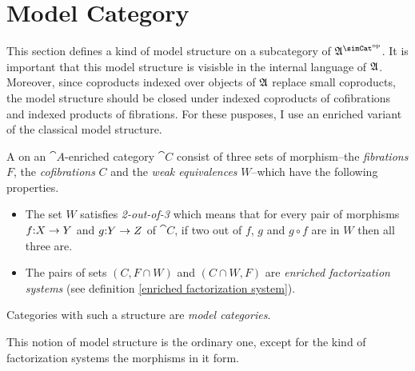\documentclass[csh.tex]{subfiles}
\begin{document}
\section{Model Category}
This section defines a kind of model structure on a subcategory of $\ambient\s$. 
It is important that this model structure is visisble in the internal language 
of $\mathfrak A$. Moreover, since coproducts indexed over objects of $\mathfrak A$ 
replace small coproducts, the model structure should be closed under indexed
coproducts of cofibrations and indexed products of fibrations. For these
pusposes, I use an enriched variant of the classical model structure.

\begin{definition} A  on an $\cat A$-enriched 
  category $\cat C$ consist of three sets of morphism--the \emph{fibrations} 
  $F$, the \emph{cofibrations} $C$ and the \emph{weak equivalences} $W$--which 
  have the following properties. 
\begin{itemize}
\item The set $W$ satisfies \emph{2-out-of-3} which means that for every pair 
of morphisms $f\mathord : X\to Y$ and $g\mathord : Y\to Z$ of $\cat C$, if two out of $f$, 
$g$ and $g\circ f$ are in $W$ then all three are. 
\item The pairs of sets $(C,F\cap W)$ and $(C\cap W,F)$ are \emph{enriched 
factorization systems} (see definition \ref{enriched factorization system}). 
\end{itemize}

Categories with such a structure are \emph{model categories}.
\end{definition}

This notion of model structure is the ordinary one, except for the kind of
 factorization systems the morphisms in it form.
\end{document}
